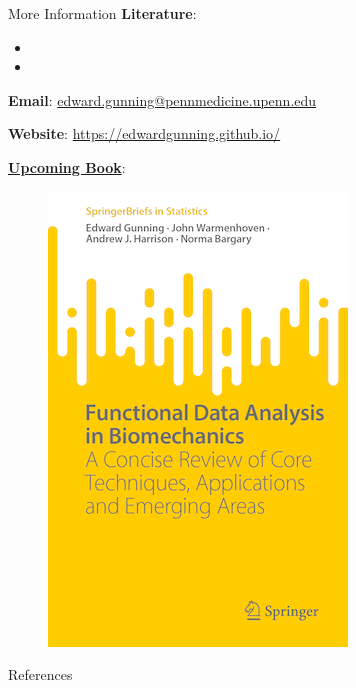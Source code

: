 \documentclass[aspectratio=128,xcolor=dvipsnames, notes]{beamer}
\newcommand{\1}{\mathbf{1}}
\begin{document}
\begin{frame}{More Information}
\small
   \textbf{Literature}:
   \begin{itemize}
       \item {}
       \item {}
   \end{itemize}
\textbf{Email}: \href{mailto:edward.gunning@pennmedicine.upenn.edu}{edward.gunning@pennmedicine.upenn.edu}


\textbf{Website}: \url{https://edwardgunning.github.io/}   
   
\textbf{\href{https://link.springer.com/book/9783031688614}{Upcoming Book}}:
   \begin{figure}
       \centering
       \includegraphics[width=0.175\linewidth]{figures/book_frontcover.png}
       \label{fig:enter-label}
   \end{figure}
\end{frame}

\begin{frame}{References}
       \printbibliography
\end{frame}
\end{document}

